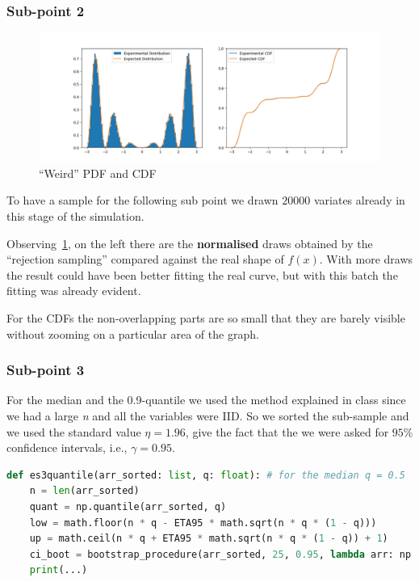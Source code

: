 \documentclass[10pt,a4paper]{article}
\begin{document}
\subsubsection*{Sub-point 2}

\begin{figure}[h]
  \centering
  \includegraphics[scale=0.5]{es2.png}
  \caption{``Weird'' PDF and CDF}
  \label{fig:4}
\end{figure}
To have a sample for the following sub point we drawn \(20000\) variates already in this stage of the simulation.

Observing~\ref{fig:4}, on the left there are the \textbf{normalised} draws obtained by the ``rejection sampling'' compared against the real shape of \(f(x)\). With more draws the result could have been better fitting the real curve, but with this batch the fitting was already evident.

For the CDFs the non-overlapping parts are so small that they are barely visible without zooming on a particular area of the graph.

\subsubsection*{Sub-point 3}

For the median and the 0.9-quantile we used the method explained in class since we had a large \emph{n} and all the variables were IID. So we sorted the sub-sample and we used the standard value \(\eta = 1.96\), give the fact that the we were asked for \(95\%\) confidence intervals, i.e., \(\gamma = 0.95\).

\begin{lstlisting}[language=python]
def es3quantile(arr_sorted: list, q: float): # for the median q = 0.5
    n = len(arr_sorted)
    quant = np.quantile(arr_sorted, q)
    low = math.floor(n * q - ETA95 * math.sqrt(n * q * (1 - q)))
    up = math.ceil(n * q + ETA95 * math.sqrt(n * q * (1 - q)) + 1)
    ci_boot = bootstrap_procedure(arr_sorted, 25, 0.95, lambda arr: np.quantile(arr, q))
    print(...)
\end{lstlisting}
\end{document}
